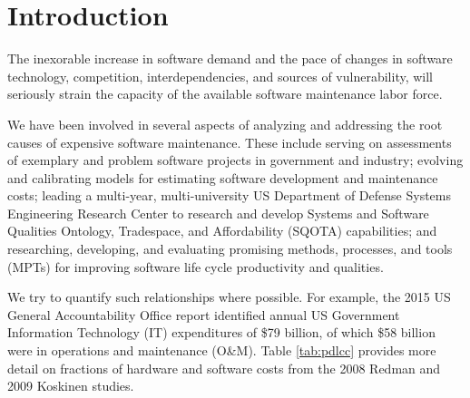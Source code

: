 \section{Introduction}
\label{sec:introudction}

The inexorable increase in software demand and the pace of changes in software technology, competition, interdependencies, and sources of vulnerability, will seriously strain the capacity of the available software maintenance labor force.

We have been involved in several aspects of analyzing and addressing the root causes of expensive software maintenance.
These include serving on assessments of
exemplary and
problem software projects in government and industry;
evolving and calibrating models for estimating software development and maintenance costs;
leading a multi-year, multi-university US Department of Defense Systems Engineering Research Center to research and develop Systems and Software Qualities Ontology, Tradespace, and Affordability (SQOTA) capabilities;
and researching, developing, and evaluating promising methods, processes, and tools (MPTs) for improving software life cycle productivity and qualities.

We try to quantify such relationships where possible.
For example, the 2015 US General Accountability Office report \cite{dodaro2015government} identified annual US Government Information Technology (IT) expenditures of \$79 billion, of which \$58 billion were in operations and maintenance (O\&M).
Table \ref{tab:pdlcc} provides more detail on fractions of hardware and software costs from the 2008 Redman \cite{redman2008weapon} and  2009 Koskinen \cite{koskinen2009software} studies.


\begin{table}[htbp]
	\centering
	\caption{Percentage of Post-Deployment Life Cycle Cost}
	\label{tab:pdlcc}
	\vspace{-0.3cm}
\end{table}%

